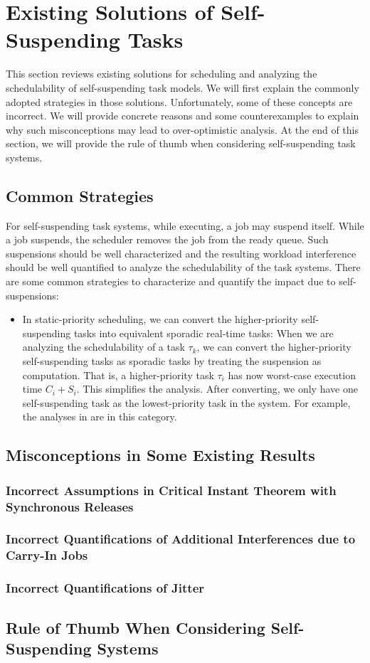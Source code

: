 \section{Existing Solutions of Self-Suspending Tasks}

This section reviews existing solutions for scheduling and analyzing the schedulability of self-suspending task models. We will first explain the commonly adopted strategies in those solutions. Unfortunately, some of these concepts are incorrect. We will provide concrete reasons and some counterexamples to explain why such misconceptions may lead to over-optimistic analysis. At the end of this section, we will provide the rule of thumb when considering self-suspending task systems. 


\subsection{Common Strategies}

For self-suspending task systems, while executing, a job may suspend itself. While a job suspends, the scheduler removes the job from the ready queue. Such suspensions should be well characterized and the resulting workload interference should be well quantified to analyze the schedulability of the task systems. There are some common strategies to characterize and quantify the impact due to self-suspensions:
\begin{itemize}
\item In static-priority scheduling, we can convert the higher-priority self-suspending tasks into equivalent sporadic real-time tasks: When we are analyzing the schedulability of a task $\tau_k$, we can convert the higher-priority self-suspending tasks as sporadic tasks by treating the suspension as computation. That is, a higher-priority task $\tau_i$ has now worst-case execution time $C_i+S_i$. This simplifies the analysis. After converting, we only have one self-suspending task as the lowest-priority task in the system. For example, the analyses in \cite{LR:rtas10,ecrts15nelissen} are in this category.
\end{itemize}


\subsection{Misconceptions in Some Existing Results}
\subsubsection{Incorrect Assumptions in Critical Instant Theorem with Synchronous Releases}
\subsubsection{Incorrect Quantifications of Additional Interferences due to Carry-In Jobs}
\subsubsection{Incorrect Quantifications of Jitter}
\subsection{Rule of Thumb When Considering Self-Suspending Systems}
  
  
  
  
  